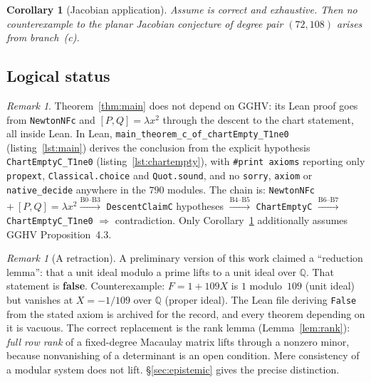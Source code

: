\documentclass[a4paper,11pt]{article}
\theoremstyle{plain}
\newtheorem{corollary}[theorem]{Corollary}
\theoremstyle{definition}
\theoremstyle{remark}
\newtheorem{remark}[theorem]{Remark}
\begin{document}
\begin{corollary}[Jacobian application]\label{cor:gghv}
Assume \cite[Proposition~4.3]{GGHV} is correct and exhaustive. Then no counterexample to the planar Jacobian conjecture of degree pair $(72,108)$ arises from branch~(c).
\end{corollary}

\subsection{Logical status}

\begin{remark}\label{rem:conditional}
Theorem~\ref{thm:main} does not depend on GGHV: its Lean proof goes from \texttt{NewtonNFc} and $[P,Q]=\lambda x^2$ through the descent to the chart statement, all inside Lean. In Lean, \texttt{main\_theorem\_c\_of\_chartEmpty\_T1ne0} (listing~\ref{lst:main}) derives the conclusion from the explicit hypothesis \texttt{ChartEmptyC\_T1ne0} (listing~\ref{lst:chartempty}), with \texttt{\#print axioms} reporting only \texttt{propext}, \texttt{Classical.choice} and \texttt{Quot.sound}, and no \texttt{sorry}, \texttt{axiom} or \texttt{native\_decide} anywhere in the $790$ modules. The chain is:
\texttt{NewtonNFc} $+\ [P,Q]=\lambda x^2 \xrightarrow{\text{B0--B3}}$ \texttt{DescentClaimC} hypotheses $\xrightarrow{\text{B4--B5}}$ \texttt{ChartEmptyC} $\xrightarrow{\text{B6--B7}}$ \texttt{ChartEmptyC\_T1ne0} $\Rightarrow$ contradiction.
Only Corollary~\ref{cor:gghv} additionally assumes GGHV Proposition~4.3.
\end{remark}

\begin{remark}[A retraction]\label{rem:retraction}
A preliminary version of this work claimed a ``reduction lemma'': that a unit ideal modulo a prime lifts to a unit ideal over $\mathbb{Q}$. That statement is \textbf{false}. Counterexample: $F=1+109X$ is $1$ modulo~$109$ (unit ideal) but vanishes at $X=-1/109$ over $\mathbb{Q}$ (proper ideal). The Lean file deriving \texttt{False} from the stated axiom is archived for the record, and every theorem depending on it is vacuous. The correct replacement is the rank lemma (Lemma~\ref{lem:rank}): \emph{full row rank} of a fixed-degree Macaulay matrix lifts through a nonzero minor, because nonvanishing of a determinant is an open condition. Mere consistency of a modular system does not lift. \S\ref{sec:epistemic} gives the precise distinction.
\end{remark}
\end{document}

